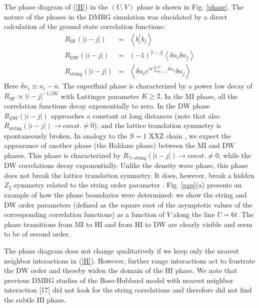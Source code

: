 \documentclass[prb,twocolumn,,amsmath,amssymb,floatfix]{revtex4}
\begin{document}
The phase diagram of (\ref{H}) in the $(U,V)$ plane is shown in Fig.
\ref{phase}. The nature of the phases in the DMRG simulation was
elucidated by a direct calculation of the ground state correlation
functions:
\begin{eqnarray}
R_{\text{SF}}\left(\left\vert
i-j\right\vert \right) &=&\left\langle
b_{i}^{\dagger }b_{j}\right\rangle  \label{SFCorr} \\
R_{\text{DW}}\left( \left\vert i-j\right\vert \right) &=&\left(
-1\right) ^{\left\vert i-j\right\vert }\left\langle \delta
n_{i}\delta
n_{j}\right\rangle  \label{DWCorr} \\
R_{\text{string}}\left( \left\vert i-j\right\vert \right)
&=&\left\langle \delta n_{i}e^{i\pi \sum_{k=i}^{j}\delta
n_{k}}\delta n_{j}\right\rangle \label{StringCorr}
\end{eqnarray}
Here $\delta n_i \equiv n_i-{\bar n}$. The superfluid phase is
characterized by a power law decay of $R_{\text{SF}}\propto
|i-j|^{-1/2K}$ with Luttinger parameter $K\ge 2$. In the MI phase, all the correlation
functions decay exponentially to zero. In the DW phase $R_{DW}\left(
\left\vert i-j\right\vert \right)$ approaches a constant at long
distances (note that also $R_{\text{string}}\left( \left\vert
i-j\right\vert \right) \rightarrow const.\neq 0$), and the lattice
translation symmetry is spontaneously broken. In analogy to the
$S=1$ XXZ chain \cite{rommelse,Schulz,KennedyTasaki,numerics_xxz},
we expect the appearance of another phase (the Haldane phase)
between the MI and DW phases. This phase is characterized by $R_{\text{%
string}}\left( \left\vert i-j\right\vert \right) \rightarrow
const.\neq 0$, while the DW correlations decay exponentially. Unlike
the density wave phase, this phase does not break the lattice
translation symmetry. It does, however, break a hidden $Z_{2}$
symmetry related to the string order parameter
\cite{tasaki,KennedyTasaki}. Fig. \ref{gap}(a) presents an example
of how the phase boundaries were determined: we show the string and
DW order parameters (defined as the square root of the asymptotic
values of the corresponding correlation functions) as a function of
$V$ along the line $U=6t$. The phase transitions from MI to HI and
from HI to DW are clearly visible and seem to be of second order.

The phase diagram does not change qualitatively if we keep only
the nearest neighbor interactions in (\ref{H}). However, further
range interactions act to frustrate the DW order and thereby widen
the domain of the HI phase. We note that previous DMRG studies of 
the Bose-Hubbard model with nearest neighbor interaction [17] did 
not look for the string correlations and therefore did not find the subtle HI phase.
\end{document}
